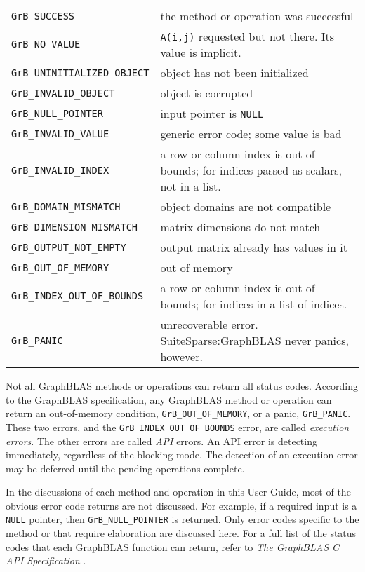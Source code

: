 \documentclass[12pt]{article}
\begin{document}
\vspace{0.2in}
\noindent
{\small
\begin{tabular}{lp{3in}}
\hline
\verb'GrB_SUCCESS'              & the method or operation was successful \\
\verb'GrB_NO_VALUE'             & \verb'A(i,j)' requested but not there.
                                  Its value is implicit. \\
\hline
\verb'GrB_UNINITIALIZED_OBJECT' & object has not been initialized \\
\verb'GrB_INVALID_OBJECT'       & object is corrupted \\
\verb'GrB_NULL_POINTER'         & input pointer is \verb'NULL' \\
\verb'GrB_INVALID_VALUE'        & generic error code; some value is bad \\
\verb'GrB_INVALID_INDEX'        & a row or column index is out of bounds; for
                                  indices passed as scalars, not in a list. \\
\verb'GrB_DOMAIN_MISMATCH'      & object domains are not compatible \\
\verb'GrB_DIMENSION_MISMATCH'   & matrix dimensions do not match \\
\verb'GrB_OUTPUT_NOT_EMPTY'     & output matrix already has values in it \\
\hline
\verb'GrB_OUT_OF_MEMORY'        & out of memory \\
\verb'GrB_INDEX_OUT_OF_BOUNDS'  & a row or column index is out of bounds;
                                  for indices in a list of indices. \\
\hline
\verb'GrB_PANIC'                & unrecoverable error.
SuiteSparse:GraphBLAS never panics, however.
\\
\hline
\end{tabular}
\vspace{0.2in}
}

Not all GraphBLAS methods or operations can return all status codes.  According
to the GraphBLAS specification, any GraphBLAS method or operation can return an
out-of-memory condition, \verb'GrB_OUT_OF_MEMORY', or a panic,
\verb'GrB_PANIC'.  These two errors, and the \verb'GrB_INDEX_OUT_OF_BOUNDS'
error, are called {\em execution errors}.  The other errors are called {\em
API} errors.  An API error is detecting immediately, regardless of the blocking
mode.  The detection of an execution error may be deferred until the pending
operations complete.

In the discussions of each method and operation in this User Guide, most of the
obvious error code returns are not discussed.  For example, if a required input
is a \verb'NULL' pointer, then \verb'GrB_NULL_POINTER' is returned.  Only error
codes specific to the method or that require elaboration are discussed here.
For a full list of the status codes that each GraphBLAS function can return,
refer to {\em The GraphBLAS C API Specification} \cite{spec}.
\end{document}
